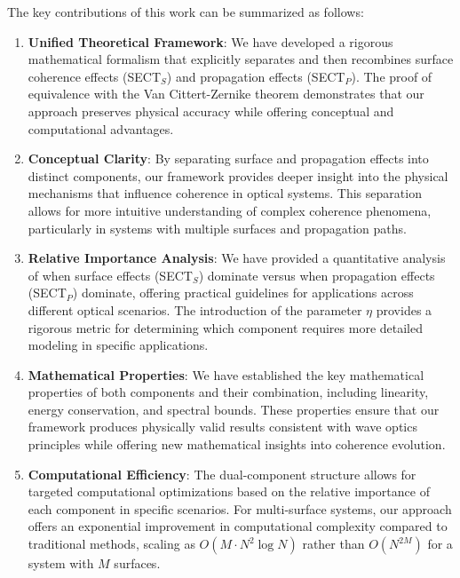 \documentclass[a4paper,12pt]{article}
\begin{document}
\vspace{0.3cm}

The key contributions of this work can be summarized as follows:

\begin{enumerate}
   \item \textbf{Unified Theoretical Framework}: We have developed a rigorous mathematical formalism that explicitly separates and then recombines surface coherence effects (SECT$_S$) and propagation effects (SECT$_P$). The proof of equivalence with the Van Cittert-Zernike theorem demonstrates that our approach preserves physical accuracy while offering conceptual and computational advantages.
   
   \item \textbf{Conceptual Clarity}: By separating surface and propagation effects into distinct components, our framework provides deeper insight into the physical mechanisms that influence coherence in optical systems. This separation allows for more intuitive understanding of complex coherence phenomena, particularly in systems with multiple surfaces and propagation paths.
   
   \item \textbf{Relative Importance Analysis}: We have provided a quantitative analysis of when surface effects (SECT$_S$) dominate versus when propagation effects (SECT$_P$) dominate, offering practical guidelines for applications across different optical scenarios. The introduction of the parameter $\eta$ provides a rigorous metric for determining which component requires more detailed modeling in specific applications.
   
   \item \textbf{Mathematical Properties}: We have established the key mathematical properties of both components and their combination, including linearity, energy conservation, and spectral bounds. These properties ensure that our framework produces physically valid results consistent with wave optics principles while offering new mathematical insights into coherence evolution.
   
   \item \textbf{Computational Efficiency}: The dual-component structure allows for targeted computational optimizations based on the relative importance of each component in specific scenarios. For multi-surface systems, 
   our approach offers an exponential improvement in computational complexity compared to traditional methods, 
   scaling as $O(M \cdot N^2 \log N)$ rather than $O(N^{2M})$ for a system with $M$ surfaces.
\end{enumerate}
\end{document}
